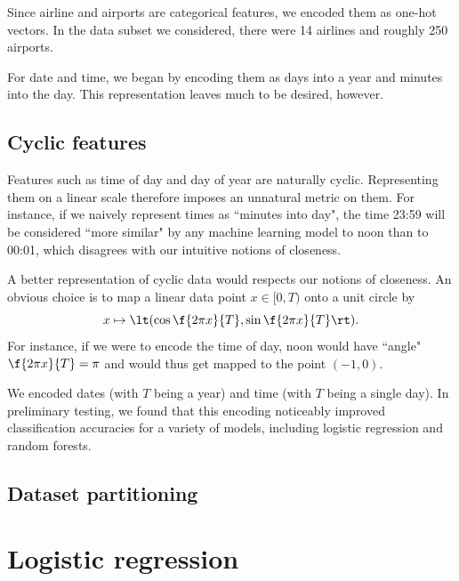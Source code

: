 \documentclass{article}
\begin{document}
\begin{multicols}{2}
Since airline and airports are categorical features,
we encoded them as one-hot vectors.
In the data subset we considered,
there were 14 airlines and roughly 250 airports.

For date and time,
we began by encoding them as days into a year
and minutes into the day.
This representation leaves much to be desired, however.


\subsection{Cyclic features}

Features such as time of day and day of year
are naturally cyclic.
Representing them on a linear scale
therefore imposes an unnatural metric on them.
For instance,
if we naively represent times as ``minutes into day",
the time 23:59 will be considered ``more similar"
by any machine learning model to noon than to 00:01,
which disagrees with our intuitive notions of closeness.

A better representation of cyclic data
would respects our notions of closeness.
An obvious choice is to map a linear data point $x \in [0, T)$
onto a unit circle by
\begin{equation}
    \label{eq:cyc-mapping}
    x \mapsto \lt(\cos\f{2\pi x}{T}, \sin\f{2\pi x}{T}\rt).
\end{equation}
For instance, if we were to encode the time of day,
noon would have ``angle" $\f{2\pi x}{T} = \pi$
and would thus get mapped to the point $(-1, 0)$.

\begin{minipage}{\linewidth}
    \centering
    
\end{minipage}

We encoded dates (with $T$ being a year)
and time (with $T$ being a single day).
In preliminary testing,
we found that this encoding
noticeably improved classification accuracies
for a variety of models,
including logistic regression and random forests.

\subsection{Dataset partitioning}


\section{Logistic regression}


\end{multicols}
\end{document}
